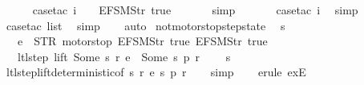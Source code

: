 \begin{isabellebody}
\ \ \ \ \isamarkupfalse%
\ {\isacharparenleft}case{\isacharunderscore}tac\ {\isachardoublequoteopen}i\ {\isacharbang}\ {}\ {\isacharequal}\ {\isacharparenleft}EFSM{\isachardot}Str\ {\isacharprime}{\isacharprime}true{\isacharprime}{\isacharprime}{\isacharparenright}{\isachardoublequoteclose}{\isacharparenright}\isanewline
\ \ \ \ \ \isamarkupfalse%
\ simp\isanewline
\ \ \ \ \ \isamarkupfalse%
\ {\isacharparenleft}case{\isacharunderscore}tac\ i{\isacharparenright}\ \isamarkupfalse%
\ simp\isanewline
\ \ \ \ \ \isamarkupfalse%
\ {\isacharparenleft}case{\isacharunderscore}tac\ list{\isacharparenright}\ \isamarkupfalse%
\ simp\isanewline
\ \ \isamarkupfalse%
\ auto%
\endisatagproof
{\isafoldproof}%
%
\isadelimproof
\isanewline
%
\endisadelimproof
\isanewline
{}\isamarkupfalse%
\ not{\isacharunderscore}motorstop{\isacharunderscore}step{\isacharunderscore}state{\isacharcolon}\isanewline
\ \ {\isachardoublequoteopen}s\ {\isasymin}\ {\isacharbraceleft}{}{\isacharcomma}\ {}{\isacharcomma}\ {}{\isacharcomma}\ {}{\isacharbraceright}\ {\isasymLongrightarrow}\isanewline
\ \ \ e\ {\isasymnoteq}\ {\isacharparenleft}STR\ {\isacharprime}{\isacharprime}motorstop{\isacharprime}{\isacharprime}{\isacharcomma}\ {\isacharbrackleft}EFSM{\isachardot}Str\ {\isacharprime}{\isacharprime}true{\isacharprime}{\isacharprime}{\isacharcomma}\ EFSM{\isachardot}Str\ {\isacharprime}{\isacharprime}true{\isacharprime}{\isacharprime}{\isacharbrackright}{\isacharparenright}\ {\isasymLongrightarrow}\isanewline
\ \ \ ltl{\isacharunderscore}step\ lift\ {\isacharparenleft}Some\ s{\isacharparenright}\ r\ e\ {\isacharequal}\ {\isacharparenleft}Some\ s{\isacharprime}{\isacharcomma}\ p{\isacharcomma}\ r{\isacharprime}{\isacharparenright}\ {\isasymLongrightarrow}\isanewline
\ \ \ s{\isacharprime}\ {\isasymin}\ {\isacharbraceleft}{}{\isacharcomma}\ {}{\isacharcomma}\ {}{\isacharcomma}\ {}{\isacharbraceright}{\isachardoublequoteclose}\isanewline
%
\isadelimproof
\ \ %
\endisadelimproof
%
\isatagproof
{}\isamarkupfalse%
\ ltl{\isacharunderscore}step{\isacharunderscore}lift{\isacharunderscore}deterministic{\isacharbrackleft}of\ s\ r\ e\ s{\isacharprime}\ p\ r{\isacharprime}{\isacharbrackright}\isanewline
\ \ \isamarkupfalse%
\ simp\isanewline
\ \ \isamarkupfalse%
\ {\isacharparenleft}erule\ exE{\isacharparenright}\isanewline

\end{isabellebody}

